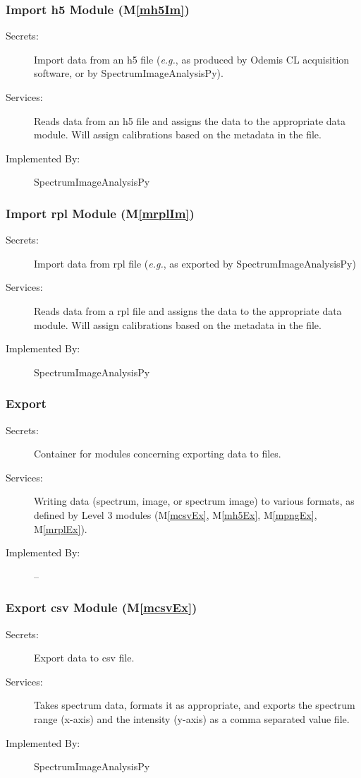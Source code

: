 \documentclass[12pt, titlepage]{article}
\newcommand{\mref}[1]{M\ref{#1}}
\newcommand{\progname}{SpectrumImageAnalysisPy}
\begin{document}
\subsubsection{Import h5 Module (\mref{mh5Im})}
\begin{description}
	\item[Secrets:]Import data from an h5 file (\textit{e.g.}, as produced by Odemis CL acquisition software, or by \progname).
	\item[Services:]Reads data from an h5 file and assigns the data to the appropriate data module. Will assign calibrations based on the metadata in the file.
	\item[Implemented By:] \progname
\end{description}

\subsubsection{Import rpl Module (\mref{mrplIm})}
\begin{description}
	\item[Secrets:]Import data from rpl file (\textit{e.g.}, as exported by \progname)
	\item[Services:]Reads data from a rpl file and assigns the data to the appropriate data module. Will assign calibrations based on the metadata in the file.
	\item[Implemented By:] \progname
\end{description}

\subsubsection{Export}
\begin{description}
	\item[Secrets:]Container for modules concerning exporting data to files.
	\item[Services:]Writing data (spectrum, image, or spectrum image) to various formats, as defined by Level 3 modules (\mref{mcsvEx}, \mref{mh5Ex}, \mref{mpngEx}, \mref{mrplEx}).
	\item[Implemented By:] --
\end{description}

\subsubsection{Export csv Module (\mref{mcsvEx})}
\begin{description}
	\item[Secrets:]Export data to csv file.
	\item[Services:]Takes spectrum data, formats it as appropriate, and exports the spectrum range (x-axis) and the intensity (y-axis) as a comma separated value file.
	\item[Implemented By:] \progname
\end{description}
\end{document}
